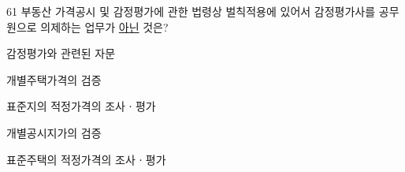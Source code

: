\begin{question}{61}
부동산 가격공시 및 감정평가에 관한 법령상 벌칙적용에 있어서 감정평가사를 공무원으로 의제하는 업무가 \uline{아닌} 것은?
\begin{choices}
  \item 감정평가와 관련된 자문
  \item 개별주택가격의 검증
  \item 표준지의 적정가격의 조사ㆍ평가
  \item 개별공시지가의 검증
  \item 표준주택의 적정가격의 조사ㆍ평가
\end{choices}
\end{question}
